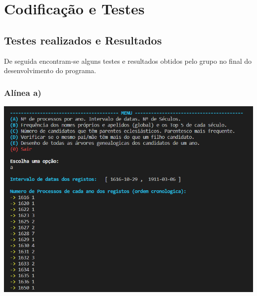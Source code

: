 \documentclass[11pt,a4paper]{report}
\begin{document}
	

\chapter{Codificação e Testes}  	%

\section{Testes realizados e Resultados}

\qquad De seguida encontram-se alguns testes e resultados obtidos pelo grupo no final do desenvolvimento do programa.\par

	\subsection*{ Alínea a)}

	\begin{center}
	\includegraphics[scale=0.8]{images/a1}
	\end{center}
\end{document}
